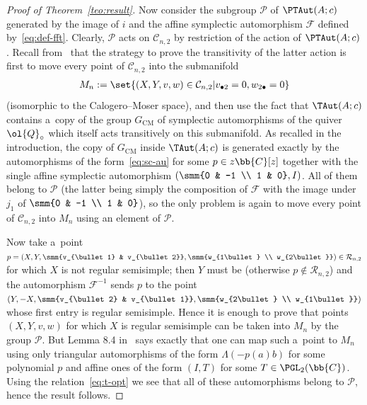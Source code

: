 \begin{proof}[Proof of Theorem~\ref{teo:result}]
Now consider the subgroup \(\mathcal{P}\) of \(\PTAut(A;c)\) generated by the image of \(i\) and the
af\/f\/ine symplectic automorphism \(\mathcal{F}\) def\/ined by~\eqref{eq:def-fft}.
Clearly, \(\mathcal{P}\) acts on \(\mathcal{C}_{n,2}\) by restriction of the action of \(\PTAut(A;c)\).
Recall from~\cite{bp08} that the strategy to prove the transitivity of the latter action is f\/irst to move
every point of \(\mathcal{C}_{n,2}\) into the submanifold
\begin{gather*}
M_{n}\mathrel{:=}\set{(X,Y,v,w)\in\mathcal{C}_{n,2}|v_{\bullet2}=0,w_{2\bullet}=0}
\end{gather*}
(isomorphic to the Calogero--Moser space), and then use the fact that \(\TAut(A;c)\) contains a~copy of the
group \(G_{\mathrm{CM}}\) of symplectic automorphisms of the quiver \(\ol{Q}_{\circ}\) which itself acts
transitively on this submanifold.
As recalled in the introduction, the copy of \(G_{\mathrm{CM}}\) inside \(\TAut(A;c)\) is generated exactly
by the automorphisms of the form~\eqref{eq:sc-au} for some \(p\in z\bb{C}[z]\) together with the single
af\/f\/ine symplectic automorphism \((\smm{0 & -1
\\
1 & 0},I)\).
All of them belong to \(\mathcal{P}\) (the latter being simply the composition of \(\mathcal{F}\) with the
image under \(j_{1}\) of \(\smm{0 & -1
\\
1 & 0}\)), so the only problem is again to move every point of \(\mathcal{C}_{n,2}\) into \(M_{n}\) using
an element of \(\mathcal{P}\).

Now take a~point \(p = (X,Y,\smm{v_{\bullet 1} & v_{\bullet 2}}, \smm{w_{1\bullet}
\\
w_{2\bullet}})\in \mathcal{R}_{n,2}\) for which \(X\) is not regular semisimple; then \(Y\) must be
(otherwise \(p\notin \mathcal{R}_{n,2}\)) and the automorphism \(\mathcal{F}^{-1}\) sends \(p\) to the
point \((Y,-X,\smm{v_{\bullet 2} & v_{\bullet 1}}, \smm{w_{2\bullet}
\\
w_{1\bullet}})\) whose f\/irst entry is regular semisimple.
Hence it is enough to prove that points \((X,Y,v,w)\) for which \(X\) is regular semisimple can be taken
into \(M_{n}\) by the group \(\mathcal{P}\).
But Lemma 8.4 in~\cite{bp08} says exactly that one can map such a~point to \(M_{n}\) using only triangular
automorphisms of the form \(\Lambda(-p(a)b)\) for some polynomial \(p\) and af\/f\/ine ones of the form
\((I,T)\) for some \(T\in \PGL_{2}(\bb{C})\).
Using the relation~\eqref{eq:t-opt} we see that all of these automorphisms belong to \(\mathcal{P}\), hence
the result follows.
\end{proof}
